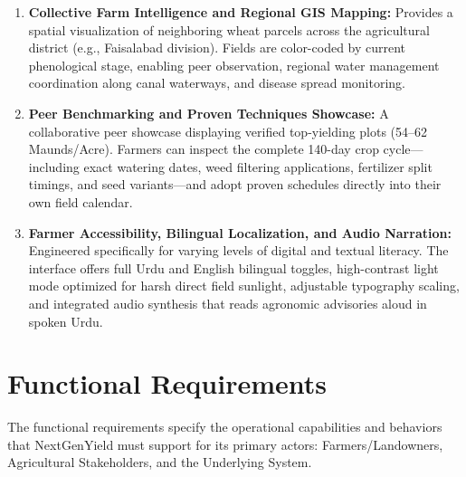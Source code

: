 \begin{enumerate}
    \item \textbf{Collective Farm Intelligence and Regional GIS Mapping:} Provides a spatial visualization of neighboring wheat parcels across the agricultural district (e.g., Faisalabad division). Fields are color-coded by current phenological stage, enabling peer observation, regional water management coordination along canal waterways, and disease spread monitoring.
    \item \textbf{Peer Benchmarking and Proven Techniques Showcase:} A collaborative peer showcase displaying verified top-yielding plots (54--62 Maunds/Acre). Farmers can inspect the complete 140-day crop cycle---including exact watering dates, weed filtering applications, fertilizer split timings, and seed variants---and adopt proven schedules directly into their own field calendar.
    \item \textbf{Farmer Accessibility, Bilingual Localization, and Audio Narration:} Engineered specifically for varying levels of digital and textual literacy. The interface offers full Urdu and English bilingual toggles, high-contrast light mode optimized for harsh direct field sunlight, adjustable typography scaling, and integrated audio synthesis that reads agronomic advisories aloud in spoken Urdu.
\end{enumerate}

\section{Functional Requirements}
The functional requirements specify the operational capabilities and behaviors that NextGenYield must support for its primary actors: Farmers/Landowners, Agricultural Stakeholders, and the Underlying System.

